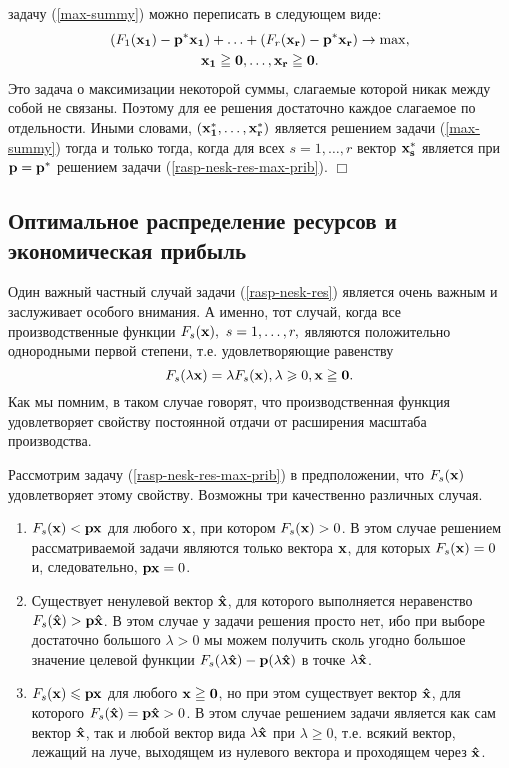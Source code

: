     задачу (\ref{max-summy}) можно переписать в следующем виде:
\begin{multline}\label{max-summy-1}
    (F_{1}(\mathbf{x_{1}})-\mathbf{p^{*}}\mathbf{x_{1}})+\ldots+(F_{r}(\mathbf{x_{r}})-\mathbf{p^{*}}\mathbf{x_{r}})
    \rightarrow \max,
    \\ \mathbf{x_{1}}\geqq\mathbf{0},\ldots,\mathbf{x_{r}}\geqq\mathbf{0}.
\end{multline}
    Это задача о максимизации некоторой суммы, слагаемые которой
    никак между собой не связаны. Поэтому для ее решения достаточно
    каждое слагаемое по отдельности. Иными словами,
    $(\mathbf{x_{1}^{*}},\ldots,\mathbf{x_{r}^{*}})$ является решением
    задачи (\ref{max-summy}) тогда и только тогда, когда для всех
    $s=1,\ldots,r$ вектор $\mathbf{x_{s}^{*}}$ является при $\mathbf{p}=\mathbf{p^{*}}$ решением задачи
    (\ref{rasp-nesk-res-max-prib}). $\Box$




\subsection{Оптимальное распределение ресурсов и экономическая прибыль}

    Один важный частный случай задачи (\ref{rasp-nesk-res}) является
    очень важным и заслуживает особого внимания. А именно, тот случай,
    когда все производственные функции $F_{s}(\vc{x}), \ s=1,\ldots,r,$ являются положительно
    однородными первой степени, т.е. удовлетворяющие равенству
\[
    F_{s}(\lambda\mathbf{x})=\lambda F_{s}(\mathbf{x}), \lambda\geqslant0,
    \mathbf{x}\geqq\mathbf{0}.
\]
    Как мы помним, в таком случае говорят, что производственная
    функция  удовлетворяет свойству постоянной отдачи от расширения
    масштаба производства.

    Рассмотрим задачу (\ref{rasp-nesk-res-max-prib}) в
    предположении, что $F_{s}(\mathbf{x})$ удовлетворяет этому свойству.
    Возможны три качественно различных случая.
\begin{enumerate}
  \item $F_{s}(\mathbf{x})<\mathbf{p}\mathbf{x}$ для любого
  $\mathbf{x}$, при котором $F_{s}(\mathbf{x})>0$. В этом случае решением рассматриваемой задачи
  являются только вектора $\mathbf{x}$, для которых $F_{s}(\mathbf{x})=0$ и, следовательно, $\mathbf{p}\mathbf{x}=0$.
  \item Существует ненулевой вектор $\mathbf{\hat{x}}$, для которого
  выполняется неравенство $F_{s}(\mathbf{\hat{x}})>\mathbf{p}\mathbf{\hat{x}}$.
  В этом случае у задачи решения просто нет, ибо при выборе
  достаточно большого $\lambda>0$ мы можем получить сколь угодно
  большое значение целевой функции
  $F_{s}(\lambda\mathbf{\hat{x}})-\mathbf{p}(\lambda\mathbf{\hat{x}})$ в точке $\lambda\mathbf{\hat{x}}$.
  \item $F_{s}(\mathbf{x})\leqslant\mathbf{p}\mathbf{x}$ для любого
  $\mathbf{x}\geqq\mathbf{0}$, но при этом существует  вектор $\mathbf{\hat{x}}$, для которого
  $F_{s}(\mathbf{\hat{x}})=\mathbf{p}\mathbf{\hat{x}}>0$. В этом случае решением
  задачи является как сам вектор $\mathbf{\hat{x}}$, так и любой вектор
  вида $\lambda\mathbf{\hat{x}}$ при $\lambda\geqslant0$, т.е. всякий
  вектор, лежащий на луче, выходящем из нулевого вектора и
  проходящем через $\mathbf{\hat{x}}$.
\end{enumerate}

